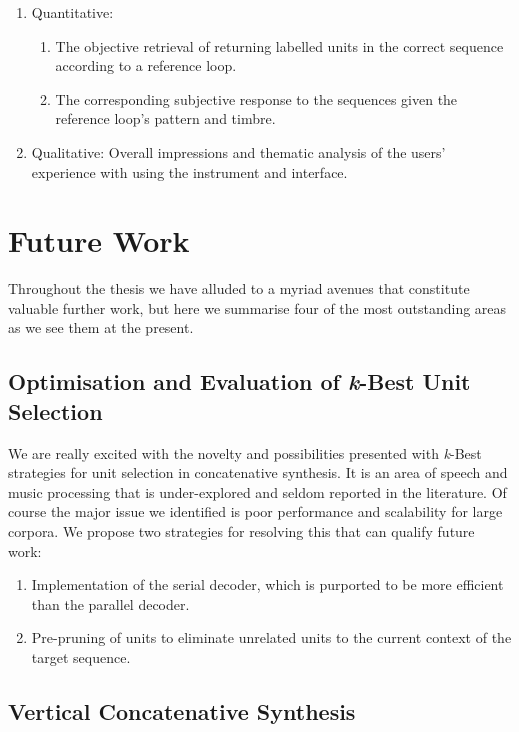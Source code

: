 \begin{enumerate}
  \item Quantitative:
\begin{enumerate}
  \item The objective retrieval of returning labelled units in the correct sequence according to a reference loop.
  \item The corresponding subjective response to the sequences given the reference loop's pattern and timbre.
\end{enumerate}
  \item Qualitative: Overall impressions and thematic analysis of the users' experience with using the instrument and interface.
\end{enumerate}

\section{Future Work}

Throughout the thesis we have alluded to a myriad avenues that constitute valuable further work, but here we summarise four of the most outstanding areas as we see them at the present.

\subsection{Optimisation and Evaluation of \textit{k}-Best Unit Selection}

We are really excited with the novelty and possibilities presented with \textit{k}-Best strategies for unit selection in concatenative synthesis. It is an area of speech and music processing that is under-explored and seldom reported in the literature. Of course the major issue we identified is poor performance and scalability for large corpora. We propose two strategies for resolving this that can qualify future work:

\begin{enumerate}
  \item Implementation of the serial decoder, which is purported to be more efficient than the parallel decoder.
  \item Pre-pruning of units to eliminate unrelated units to the current context of the target sequence. 
\end{enumerate}

\subsection{Vertical Concatenative Synthesis}

